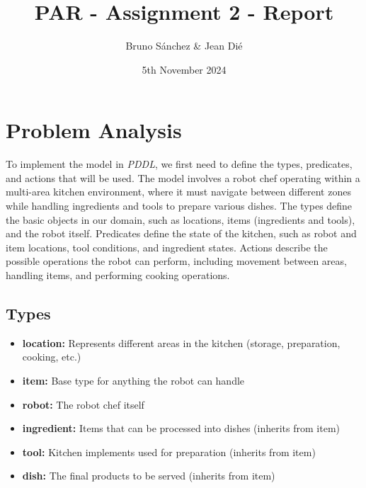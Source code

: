 \documentclass{article}
\title{PAR - Assignment 2 - Report}
\author{\normalsize Bruno Sánchez \& Jean Dié}
\date{\small 5th November 2024}
\begin{document}
\maketitle


\section{Problem Analysis}

To implement the model in \textit{PDDL}, we first need to define the types, predicates, and actions that will be used. The model involves a robot chef operating within a multi-area kitchen environment, where it must navigate between different zones while handling ingredients and tools to prepare various dishes. The types define the basic objects in our domain, such as locations, items (ingredients and tools), and the robot itself. Predicates define the state of the kitchen, such as robot and item locations, tool conditions, and ingredient states. Actions describe the possible operations the robot can perform, including movement between areas, handling items, and performing cooking operations.

\subsection{Types}
\begin{itemize}[label=--, itemsep=0.05em]
    \item \textbf{location:} Represents different areas in the kitchen (storage, preparation, cooking, etc.)
    \item \textbf{item:} Base type for anything the robot can handle
    \item \textbf{robot:} The robot chef itself
    \item \textbf{ingredient:} Items that can be processed into dishes (inherits from item)
    \item \textbf{tool:} Kitchen implements used for preparation (inherits from item)
    \item \textbf{dish:} The final products to be served (inherits from item)
\end{itemize}
\end{document}
